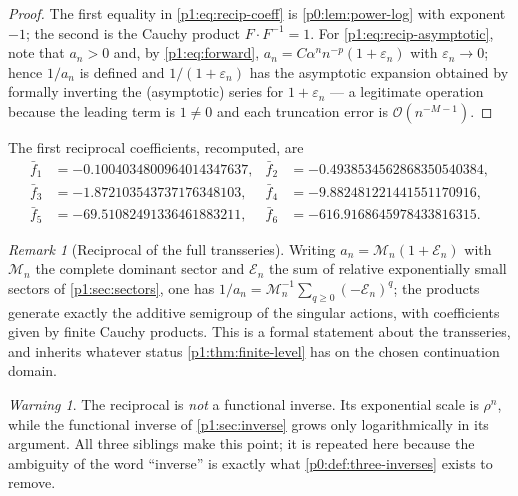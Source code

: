 \documentclass[11pt,a4paper,oneside]{book}
\theoremstyle{plain}
\theoremstyle{definition}
\theoremstyle{remark}
\newtheorem{remark}[theorem]{Remark}
\newtheorem{warning}[theorem]{Warning}
\newcommand{\bigO}{\mathcal{O}}
\begin{document}
\begin{proof}
The first equality in \cref{p1:eq:recip-coeff} is \cref{p0:lem:power-log} with exponent $-1$;
the second is the Cauchy product $F\cdot F^{-1}=1$.  For \cref{p1:eq:recip-asymptotic}, note
that $a_n>0$ and, by \cref{p1:eq:forward}, $a_n=C\alpha^nn^{-p}(1+\varepsilon_n)$ with
$\varepsilon_n\to0$; hence $1/a_n$ is defined and $1/(1+\varepsilon_n)$ has the asymptotic
expansion obtained by formally inverting the (asymptotic) series for $1+\varepsilon_n$ --- a
legitimate operation because the leading term is $1\ne0$ and each truncation error is
$\bigO(n^{-M-1})$.
\end{proof}

The first reciprocal coefficients, recomputed, are
\begin{equation}
\begin{aligned}
 \bar f_1&=-0.1004034800964014347637,&
 \bar f_2&=-0.4938534562868350540384,\\
 \bar f_3&=-1.872103543737176348103,&
 \bar f_4&=-9.882481221441551170916,\\
 \bar f_5&=-69.51082491336461883211,&
 \bar f_6&=-616.9168645978433816315 .
\end{aligned}
\label{p1:eq:recip-numeric}
\end{equation}

\begin{remark}[Reciprocal of the full transseries]
\label{p1:rem:recip-multisector}
Writing $a_n=\mathcal M_n(1+\mathcal E_n)$ with $\mathcal M_n$ the complete dominant sector
and $\mathcal E_n$ the sum of relative exponentially small sectors of \cref{p1:sec:sectors},
one has $1/a_n=\mathcal M_n^{-1}\sum_{q\ge0}(-\mathcal E_n)^{q}$; the products generate
exactly the additive semigroup of the singular actions, with coefficients given by finite
Cauchy products.  This is a formal statement about the transseries, and inherits whatever
status \cref{p1:thm:finite-level} has on the chosen continuation domain.
\end{remark}

\begin{warning}
\label{p1:rem:reciprocal}
The reciprocal is \emph{not} a functional inverse.  Its exponential scale is $\rho^{n}$, while
the functional inverse of \cref{p1:sec:inverse} grows only logarithmically in its argument.
All three siblings make this point; it is repeated here because the ambiguity of the word
``inverse'' is exactly what \cref{p0:def:three-inverses} exists to remove.
\end{warning}
\end{document}
